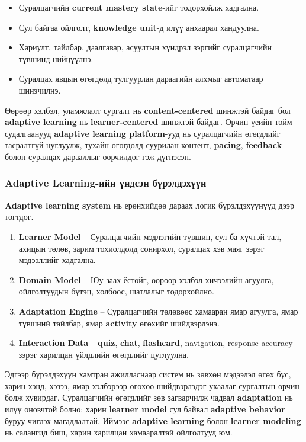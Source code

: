 \documentclass[12pt,A4]{report}
\begin{document}
\begin{itemize}
    \item Суралцагчийн \textbf{current mastery state}-ийг тодорхойлж хадгална.
    \item Сул байгаа ойлголт, \textbf{knowledge unit}-д илүү анхаарал хандуулна.
    \item Хариулт, тайлбар, даалгавар, асуултын хүндрэл зэргийг суралцагчийн түвшинд нийцүүлнэ.
    \item Суралцах явцын өгөгдөлд тулгуурлан дараагийн алхмыг автоматаар шинэчилнэ.
\end{itemize}

Өөрөөр хэлбэл, уламжлалт сургалт нь \textbf{content-centered} шинжтэй байдаг бол \textbf{adaptive learning} нь \textbf{learner-centered} шинжтэй байдаг. Орчин үеийн тойм судалгаанууд \textbf{adaptive learning platform}-ууд нь суралцагчийн өгөгдлийг тасралтгүй цуглуулж, тухайн өгөгдөлд суурилан контент, \textbf{pacing}, \textbf{feedback} болон суралцах дарааллыг өөрчилдөг гэж дүгнэсэн.

\subsubsection*{Adaptive Learning-ийн үндсэн бүрэлдэхүүн}

\textbf{Adaptive learning system} нь ерөнхийдөө дараах логик бүрэлдэхүүнүүд дээр тогтдог.

\begin{enumerate}
    \item \textbf{Learner Model} -- Суралцагчийн мэдлэгийн түвшин, сул ба хүчтэй тал, ахицын төлөв, зарим тохиолдолд сонирхол, суралцах хэв маяг зэрэг мэдээллийг хадгална.
    \item \textbf{Domain Model} -- Юу заах ёстойг, өөрөөр хэлбэл хичээлийн агуулга, ойлголтуудын бүтэц, холбоос, шатлалыг тодорхойлно.
    \item \textbf{Adaptation Engine} -- Суралцагчийн төлөвөөс хамааран ямар агуулга, ямар түвшний тайлбар, ямар \textbf{activity} өгөхийг шийдвэрлэнэ.
    \item \textbf{Interaction Data} -- \textbf{quiz}, \textbf{chat}, \textbf{flashcard}, navigation, response accuracy зэрэг харилцан үйлдлийн өгөгдлийг цуглуулна.
\end{enumerate}

Эдгээр бүрэлдэхүүн хамтран ажилласнаар систем нь зөвхөн мэдээлэл өгөх бус, харин хэнд, хэзээ, ямар хэлбэрээр өгөхөө шийдвэрлэдэг ухаалаг сургалтын орчин болж хувирдаг. Суралцагчийн өгөгдлийг зөв загварчилж чадвал \textbf{adaptation} нь илүү оновчтой болно; харин \textbf{learner model} сул байвал \textbf{adaptive behavior} буруу чиглэх магадлалтай. Иймээс \textbf{adaptive learning} болон \textbf{learner modeling} нь салангид биш, харин харилцан хамааралтай ойлголтууд юм.
\end{document}
